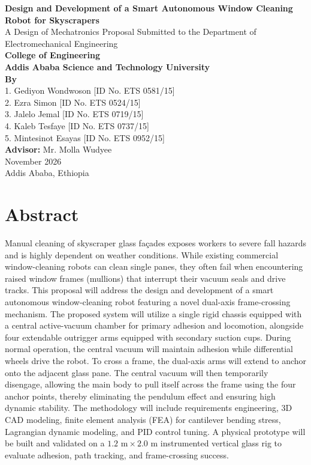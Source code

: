 \documentclass[12pt, a4paper]{article}
\begin{document}
\hypersetup{pageanchor=false}
\begin{titlepage}
    \centering
    \vspace*{1cm}
    {\Large \textbf{Design and Development of a Smart Autonomous Window Cleaning Robot for Skyscrapers}}\\[1.5cm]
    
    A Design of Mechatronics Proposal Submitted to the Department of Electromechanical Engineering\\[1cm]
    
    \textbf{College of Engineering}\\
    \textbf{Addis Ababa Science and Technology University}\\[1.5cm]
    
    \textbf{By}\\[0.5cm]
    1. Gediyon Wondwoson [ID No. ETS 0581/15]\\
    2. Ezra Simon [ID No. ETS 0524/15]\\
    3. Jalelo Jemal [ID No. ETS 0719/15]\\
    4. Kaleb Tesfaye [ID No. ETS 0737/15]\\
    5. Mintesinot Esayas [ID No. ETS 0952/15]\\[1.5cm]
    
    \textbf{Advisor:} Mr. Molla Wudyee\\[1cm]
    \vfill
    November 2026\\
    Addis Ababa, Ethiopia
\end{titlepage}
\hypersetup{pageanchor=true}

\section*{Abstract}
Manual cleaning of skyscraper glass façades exposes workers to severe fall hazards and is highly dependent on weather conditions. While existing commercial window-cleaning robots can clean single panes, they often fail when encountering raised window frames (mullions) that interrupt their vacuum seals and drive tracks. This proposal will address the design and development of a smart autonomous window-cleaning robot featuring a novel dual-axis frame-crossing mechanism. The proposed system will utilize a single rigid chassis equipped with a central active-vacuum chamber for primary adhesion and locomotion, alongside four extendable outrigger arms equipped with secondary suction cups. During normal operation, the central vacuum will maintain adhesion while differential wheels drive the robot. To cross a frame, the dual-axis arms will extend to anchor onto the adjacent glass pane. The central vacuum will then temporarily disengage, allowing the main body to pull itself across the frame using the four anchor points, thereby eliminating the pendulum effect and ensuring high dynamic stability. The methodology will include requirements engineering, 3D CAD modeling, finite element analysis (FEA) for cantilever bending stress, Lagrangian dynamic modeling, and PID control tuning. A physical prototype will be built and validated on a \(1.2\text{ m} \times 2.0\text{ m}\) instrumented vertical glass rig to evaluate adhesion, path tracking, and frame-crossing success. 
\end{document}
